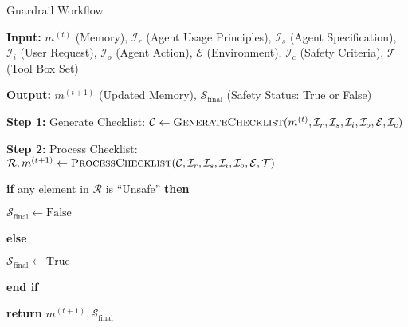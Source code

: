\begin{algorithm*}
\caption{Guardrail Workflow}
\begin{algorithmic}[1]
\item \textbf{Input:} $m^{(t)}$ (Memory), $\mathcal{I}_r$ (Agent Usage Principles), $\mathcal{I}_s$ (Agent Specification), $\mathcal{I}_i$ (User Request), $\mathcal{I}_o$ (Agent Action), $\mathcal{E}$ (Environment), $\mathcal{I}_c$ (Safety Criteria), $\mathcal{T}$ (Tool Box Set)
\item \textbf{Output:} $m^{(t+1)}$ (Updated Memory), $\mathcal{S}_\text{final}$ (Safety Status: True or False)
\item \textbf{Step 1:} Generate Checklist: $\mathcal{C} \gets \textsc{GenerateChecklist}(m^{(t)}, \mathcal{I}_r, \mathcal{I}_s, \mathcal{I}_i, \mathcal{I}_o, \mathcal{E}, \mathcal{I}_c)$
\item \textbf{Step 2:} Process Checklist: $\mathcal{R}, m^{(t+1)} \gets \textsc{ProcessChecklist}(\mathcal{C}, \mathcal{I}_r, \mathcal{I}_s, \mathcal{I}_i, \mathcal{I}_o, \mathcal{E}, \mathcal{T})$
\item \textbf{if} any element in $\mathcal{R}$ is ``Unsafe'' \textbf{then}
\item \quad $\mathcal{S}_\text{final} \gets \text{False}$
\item \textbf{else}
\item \quad $\mathcal{S}_\text{final} \gets \text{True}$
\item \textbf{end if}
\item \textbf{return} $m^{(t+1)}, \mathcal{S}_\text{final}$
\end{algorithmic}
\label{app:algorithm:guardrail_system_workflow}
\end{algorithm*}

